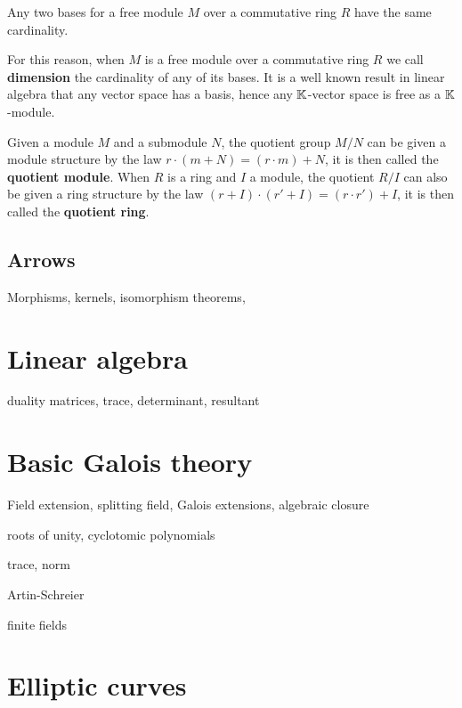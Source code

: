 \begin{proposition}
  Any two bases for a free module $M$ over a commutative ring $R$ have
  the same cardinality.
\end{proposition}

For this reason, when $M$ is a free module over a commutative ring $R$
we call  
\textbf{dimension} the cardinality of
any of its bases. It is a well known result in linear algebra that any
vector space has a basis, hence any $\mathbb{K}$-vector space is free as a
$\mathbb{K}$-module.

Given a module $M$ and a submodule $N$, the quotient group $M/N$ can
be given a module structure by the law $r\cdot(m+N)=(r\cdot m)+N$, it
is then called the \textbf{quotient
  module}. When $R$ is a ring and $I$ a module, the quotient $R/I$ can
also be given a ring structure by the law $(r+I)\cdot(r'+I)=(r\cdot
r')+I$, it is then called the \textbf{quotient
  ring}.


\subsection{Arrows}
\label{sec:ring-fields:arrows}

Morphisms, kernels, isomorphism theorems, 

\section{Linear algebra}
\label{sec:linear-algebra}

duality
matrices, trace, determinant, resultant

\section{Basic Galois theory}
\label{sec:basic-galois-theory}
Field extension, splitting field, Galois extensions, algebraic closure

roots of unity, cyclotomic polynomials

trace, norm

Artin-Schreier

finite fields


\section{Elliptic curves}
\label{sec:elliptic-curves}





